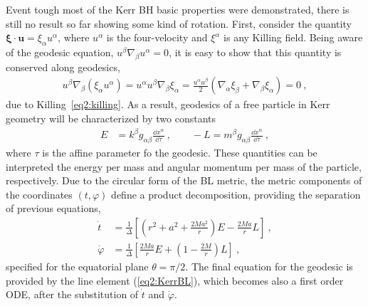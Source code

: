 Event tough most of the Kerr BH basic properties were demonstrated, there is still no result so far showing some kind of rotation.
First, consider the quantity $\bm{\xi}\cdot \bm{u} = \xi_\alpha u^\alpha$, where $u^\alpha$ is the four-velocity and $\xi^\alpha$ is any Killing field. 
Being aware of the geodesic equation, $u^\beta \nabla_\beta u^\alpha = 0$, it is easy to show that this quantity is conserved along geodesics,
\begin{align}
    u^\beta \nabla_\beta ( \xi_\alpha u^\alpha ) = u^\alpha u^\beta \nabla_\beta \xi_\alpha = \frac{u^\alpha u^\beta }{2} \left( \nabla_\alpha \xi_\beta + \nabla_\beta \xi_\alpha \right) = 0 ~,
    \label{eq2:geodesicKilling}
\end{align}
due to Killing~\eqref{eq2:killing}.
As a result, geodesics of a free particle in Kerr geometry will be characterized by two constants
\begin{align}
    E &=  k^\beta g_{\alpha\beta} \frac{\dd x^\alpha}{\dd \tau} ~, \qquad -L = m^\beta g_{\alpha\beta} \frac{\dd x^\alpha}{\dd \tau} ~,
    \label{eq2:geodesicConsts}
\end{align}
where $\tau$ is the affine parameter fo the geodesic.
These quantities can be interpreted the energy per mass and angular momentum per mass of the particle, respectively.
Due to the circular form of the BL metric, the metric components of the coordinates $(t,\varphi)$ define a product decomposition, providing the separation of previous equations,
\begin{subequations}
\begin{align}
    \dot{t} &= \frac{1}{\Delta} \left[ (r^2+a^2 +\frac{2 M a^2}{r})E - \frac{2 M a}{r} L \right] ~, \label{eq2:geodesicT} \\
    \dot{\varphi} &= \frac{1}{\Delta} \left[ \frac{2 M a}{r} E +\left( 1- \frac{2 M}{r} \right) L \right]  ~,
    \label{eq2:geodesicPhi}
\end{align}
\end{subequations}
specified for the equatorial plane $\theta=\pi/2$. The final equation for the geodesic is provided by the line element (\ref{eq2:KerrBL}), which becomes also a first order ODE, after the substitution of $\dot{t}$ and $\dot{\varphi}$. 

